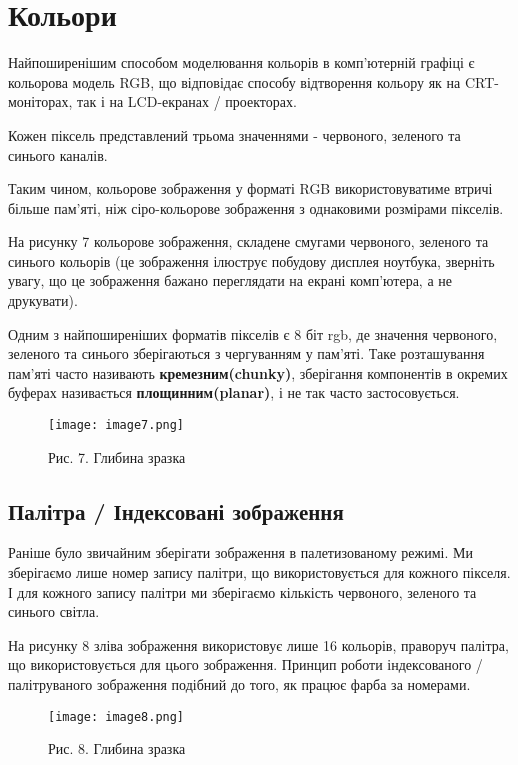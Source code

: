 \chapter{Кольори}\label{cha:color}
Найпоширенішим способом моделювання кольорів в комп'ютерній графіці є кольорова модель RGB, що відповідає способу відтворення кольору як на CRT-моніторах, так і на LCD-екранах / проекторах.

Кожен піксель представлений трьома значеннями - червоного, зеленого та синього каналів.

Таким чином, кольорове зображення у форматі RGB використовуватиме втричі більше пам'яті, ніж сіро-кольорове зображення з однаковими розмірами пікселів.

На рисунку 7 кольорове зображення, складене смугами червоного, зеленого та синього кольорів (це зображення ілюструє побудову дисплея ноутбука, зверніть увагу, що це зображення бажано переглядати на екрані комп'ютера, а не друкувати).

Одним з найпоширеніших форматів пікселів є 8 біт rgb, де значення червоного, зеленого та синього зберігаються з чергуванням у пам'яті.
Таке розташування пам'яті часто називають \textbf{кремезним(chunky)}, зберігання компонентів в окремих буферах називається \textbf{площинним(planar)}, і не так часто застосовується.

\begin{figure}
    \label{fig:image7}
    \centering
    \texttt{[image: image7.png]}

    Рис. 7. Глибина зразка
\end{figure}


\section{Палітра / Індексовані зображення}\label{sec:palette}
Раніше було звичайним зберігати зображення в палетизованому режимі.
Ми зберігаємо лише номер запису палітри, що використовується для кожного пікселя.
І для кожного запису палітри ми зберігаємо кількість червоного, зеленого та синього світла.

На рисунку 8 зліва зображення використовує лише 16 кольорів, праворуч палітра, що використовується для цього зображення.
Принцип роботи індексованого / палітруваного зображення подібний до того, як працює фарба за номерами.

\begin{figure}
    \label{fig:image8}
    \centering
    \texttt{[image: image8.png]}

    Рис. 8. Глибина зразка
\end{figure}


